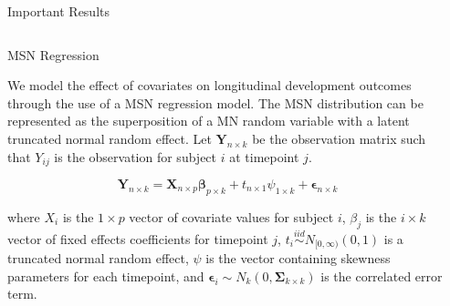 \documentclass[final]{beamer}
\newlength{\onecolwid}
\newlength{\twocolwid}
\begin{document}
\begin{frame}[t]
\begin{columns}[t]
\begin{column}{\twocolwid}
\begin{alertblock}{Important Results}
\end{alertblock} 


\begin{columns}[t,totalwidth=\twocolwid] %

\begin{column}{\onecolwid} %


\begin{block}{MSN Regression}

We model the effect of covariates on longitudinal development outcomes through the use of a MSN regression model. The MSN distribution can be represented as the superposition of a MN random variable with a latent truncated normal random effect. Let $\mathbf{Y}_{n \times k}$ be the observation matrix such that $Y_{ij}$ is the observation for subject $i$ at timepoint $j$.

$$\mathbf{Y}_{n \times k} = \mathbf{X}_{n \times p}\boldsymbol\beta_{p \times k} + t_{n \times 1}\psi_{1 \times k} + \boldsymbol\epsilon_{n \times k}$$

where $X_i$ is the $1 \times p$ vector of covariate values for subject $i$, $\beta_j$ is the $i \times k$ vector of fixed effects coefficients for timepoint $j$, $t_i \stackrel{iid}{\sim} N_{[0,\infty)}(0,1)$ is a truncated normal random effect, $\psi$ is the vector containing skewness parameters for each timepoint, and $\boldsymbol\epsilon_i \sim N_k(0,\boldsymbol\Sigma_{k \times k})$ is the correlated error term.

\end{block}


\end{column} %

\begin{column}{\onecolwid} %



\end{column}
\end{columns}
\end{column}
\end{columns}
\end{frame}
\end{document}
